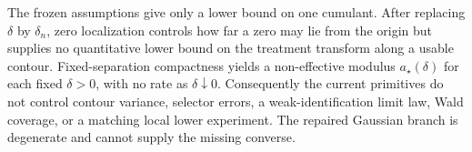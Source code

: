 The frozen assumptions give only a lower bound on one cumulant.  After replacing \(\delta\) by \(\delta_n\), zero localization controls how far a zero may lie from the origin but supplies no quantitative lower bound on the treatment transform along a usable contour.  Fixed-separation compactness yields a non-effective modulus \(a_\star(\delta)\) for each fixed \(\delta>0\), with no rate as \(\delta\downarrow0\).  Consequently the current primitives do not control contour variance, selector errors, a weak-identification limit law, Wald coverage, or a matching local lower experiment.  The repaired Gaussian branch is degenerate and cannot supply the missing converse.